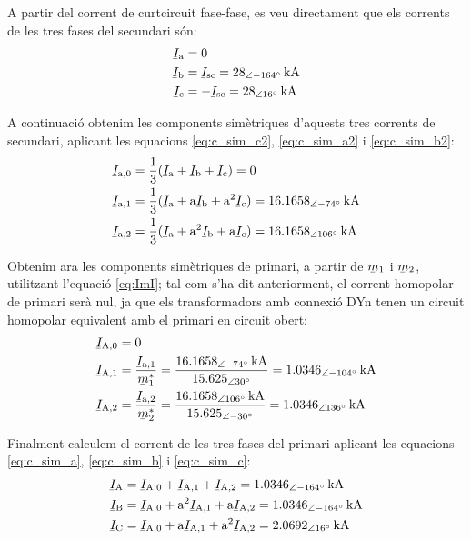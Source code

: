 \begin{exemple}
    \begin{center}
       
    \end{center}

    A partir del corrent de curtcircuit fase-fase, es veu directament que els corrents de les tres fases del secundari són:
    \begin{align*}
        \cmplx{I}\ped{a} &= 0  \\
        \cmplx{I}\ped{b} &= \cmplx{I}\ped{sc} = \qtypd{28}{-164}{kA}  \\
        \cmplx{I}\ped{c} &= -\cmplx{I}\ped{sc} = \qtypd{28}{16}{kA}
    \end{align*}

    A continuació obtenim les components simètriques d'aquests tres corrents de secundari, aplicant les equacions \eqref{eq:c_sim_c2}, \eqref{eq:c_sim_a2} i \eqref{eq:c_sim_b2}:
    \begin{align*}
        \cmplx{I}\ped{a,0} &= \frac{1}{3} (\cmplx{I}\ped{a} + \cmplx{I}\ped{b} +
        \cmplx{I}\ped{c}) = 0 \\
        \cmplx{I}\ped{a,1} &= \frac{1}{3} (\cmplx{I}\ped{a} + \au \cmplx{I}\ped{b} +
         \au^2 \cmplx{I}\ped{c}) = \qtypd{16,1658}{-74}{kA}  \\
        \cmplx{I}\ped{a,2} &= \frac{1}{3} (\cmplx{I}\ped{a} + \au^2 \cmplx{I}\ped{b} +
         \au \cmplx{I}\ped{c}) = \qtypd{16,1658}{106}{kA}
    \end{align*}

    Obtenim ara les components simètriques de primari, a partir de $\cmplx{m}_1$ i $\cmplx{m}_2$, utilitzant l'equació \eqref{eq:ImI}; tal com s'ha dit anteriorment, el corrent homopolar de primari serà nul, ja que els transformadors amb connexió DYn tenen un circuit homopolar equivalent amb el primari en circuit obert:
    \begin{align*}
        \cmplx{I}\ped{A,0} &= 0 \\
        \cmplx{I}\ped{A,1} &= \frac{\cmplx{I}\ped{a,1}}{\cmplx{m}^*_1} = \frac{\qtypd{16,1658}{-74}{kA}}{\numpd{15,625}{30}} =  \qtypd{1,0346}{-104}{kA} \\
        \cmplx{I}\ped{A,2} &= \frac{\cmplx{I}\ped{a,2}}{\cmplx{m}^*_2} = \frac{\qtypd{16,1658}{106}{kA}}{\numpd{15,625}{-30}} = \qtypd{1,0346}{136}{kA}
    \end{align*}

    Finalment calculem el corrent de les tres fases del primari aplicant les equacions \eqref{eq:c_sim_a}, \eqref{eq:c_sim_b} i \eqref{eq:c_sim_c}:
     \begin{align*}
        \cmplx{I}\ped{A} &= \cmplx{I}\ped{A,0} + \cmplx{I}\ped{A,1} + \cmplx{I}\ped{A,2} = \qtypd{1,0346}{-164}{kA} \\
        \cmplx{I}\ped{B} &= \cmplx{I}\ped{A,0} + \au^2 \cmplx{I}\ped{A,1} + \au \cmplx{I}\ped{A,2} = \qtypd{1,0346}{-164}{kA} \\
        \cmplx{I}\ped{C} &= \cmplx{I}\ped{A,0} + \au \cmplx{I}\ped{A,1} + \au^2 \cmplx{I}\ped{A,2} = \qtypd{2,0692}{16}{kA}
    \end{align*}


\end{exemple}
